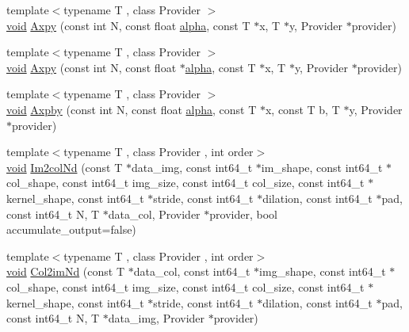 \begin{DoxyCompactItemize}
\item 
{\footnotesize template$<$typename T , class Provider $>$ }\\\mbox{\hyperlink{mlasi_8h_a88f941d423cb2a819b70a1358982b1a6}{void}} \mbox{\hyperlink{namespaceonnxruntime_1_1math_aaf20425169de6c542cbcb95208c78357}{Axpy}} (const int N, const float \mbox{\hyperlink{mlasi_8h_a1763355f32e1812e5cb3a0080e7cca12}{alpha}}, const T $\ast$x, T $\ast$y, Provider $\ast$provider)
\item 
{\footnotesize template$<$typename T , class Provider $>$ }\\\mbox{\hyperlink{mlasi_8h_a88f941d423cb2a819b70a1358982b1a6}{void}} \mbox{\hyperlink{namespaceonnxruntime_1_1math_a3f9e823f81e1ef442595fcfc405c426e}{Axpy}} (const int N, const float $\ast$\mbox{\hyperlink{mlasi_8h_a1763355f32e1812e5cb3a0080e7cca12}{alpha}}, const T $\ast$x, T $\ast$y, Provider $\ast$provider)
\item 
{\footnotesize template$<$typename T , class Provider $>$ }\\\mbox{\hyperlink{mlasi_8h_a88f941d423cb2a819b70a1358982b1a6}{void}} \mbox{\hyperlink{namespaceonnxruntime_1_1math_a4600372676aa3433743ff942d3c642a6}{Axpby}} (const int N, const float \mbox{\hyperlink{mlasi_8h_a1763355f32e1812e5cb3a0080e7cca12}{alpha}}, const T $\ast$x, const T b, T $\ast$y, Provider $\ast$provider)
\item 
{\footnotesize template$<$typename T , class Provider , int order$>$ }\\\mbox{\hyperlink{mlasi_8h_a88f941d423cb2a819b70a1358982b1a6}{void}} \mbox{\hyperlink{namespaceonnxruntime_1_1math_abf43727838ab5d569e1bc070bc23a166}{Im2col\+Nd}} (const T $\ast$data\+\_\+img, const int64\+\_\+t $\ast$im\+\_\+shape, const int64\+\_\+t $\ast$col\+\_\+shape, const int64\+\_\+t img\+\_\+size, const int64\+\_\+t col\+\_\+size, const int64\+\_\+t $\ast$kernel\+\_\+shape, const int64\+\_\+t $\ast$stride, const int64\+\_\+t $\ast$dilation, const int64\+\_\+t $\ast$pad, const int64\+\_\+t N, T $\ast$data\+\_\+col, Provider $\ast$provider, bool accumulate\+\_\+output=false)
\item 
{\footnotesize template$<$typename T , class Provider , int order$>$ }\\\mbox{\hyperlink{mlasi_8h_a88f941d423cb2a819b70a1358982b1a6}{void}} \mbox{\hyperlink{namespaceonnxruntime_1_1math_a4904838f1a00eba6f7a19daf7c959f37}{Col2im\+Nd}} (const T $\ast$data\+\_\+col, const int64\+\_\+t $\ast$img\+\_\+shape, const int64\+\_\+t $\ast$col\+\_\+shape, const int64\+\_\+t img\+\_\+size, const int64\+\_\+t col\+\_\+size, const int64\+\_\+t $\ast$kernel\+\_\+shape, const int64\+\_\+t $\ast$stride, const int64\+\_\+t $\ast$dilation, const int64\+\_\+t $\ast$pad, const int64\+\_\+t N, T $\ast$data\+\_\+img, Provider $\ast$provider)

\end{DoxyCompactItemize}

